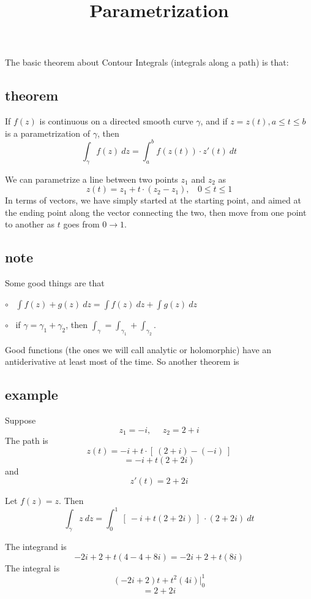 \documentclass[11pt, oneside]{article}
\title{Parametrization}
\date{}
\begin{document}
\maketitle
\Large


The basic theorem about Contour Integrals (integrals along a path) is that:

\subsection*{theorem}

If $f(z)$ is continuous on a directed smooth curve $\gamma$, and if $z = z(t), a \le t \le b$ is a parametrization of $\gamma$, then
\[ \int_{\gamma} f(z) \ dz = \int_a^b f(z(t)) \cdot z'(t) \ dt \]

We can parametrize a line between two points $z_1$ and $z_2$ as
\[ z(t) = z_1 + t \cdot (z_2 - z_1), \ \ \ \ 0 \le t \le 1 \]
In terms of vectors, we have simply started at the starting point, and aimed at the ending point along the vector connecting the two, then move from one point to another as $t$ goes from $0 \rightarrow 1$.

\subsection*{note}

Some good things are that 

$\circ$ \ $\int f(z) + g(z) \ dz = \int f(z) \ dz + \int g(z) \ dz$

$\circ$ \ if $\gamma = \gamma_1 + \gamma_2$, then $\int_{\gamma} = \int_{\gamma_1} + \int_{\gamma_2}$.

Good functions (the ones we will call analytic or holomorphic) have an antiderivative at least most of the time.  So another theorem is

\subsection*{example}

Suppose
\[ z_1 = -i, \ \ \ \ \ \ z_2 = 2 + i \]
The path is
\[ z(t) = -i + t \cdot [ \ (2 + i) - (-i) \ ] \]
\[ = -i + t (2 + 2i) \]
and
\[ z'(t) = 2 + 2i \]

Let $f(z) = z$.  Then
\[ \int_{\gamma} z \ dz = \int_0^1 \ [ \ -i + t (2 + 2i) \ ] \ \cdot (2 + 2i) \ dt \]

The integrand is
\[ -2i + 2 + t(4 - 4 + 8i) = - 2i + 2 + t(8i) \]
The integral is
\[ (-2i + 2) t + t^2(4i) \bigg |_0^1 \]
\[ = 2 + 2i \]
\end{document}
